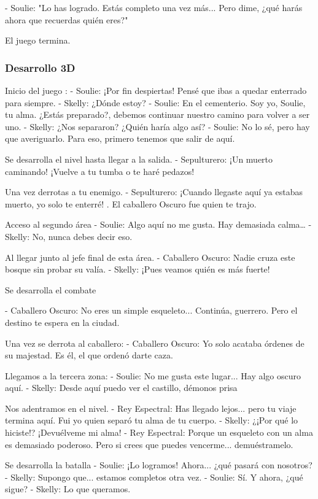 \documentclass[12pt,a4paper,twoside,spanish]{article}      %
\begin{document}
- Soulie: "Lo has logrado. Estás completo una vez más... Pero dime, ¿qué harás ahora que recuerdas quién eres?"

El juego termina.


\subsubsection{Desarrollo 3D}
Inicio del juego : 
- Soulie:  ¡Por fin despiertas! Pensé que ibas a quedar enterrado para siempre.
- Skelly:  ¿Dónde estoy?
- Soulie: En el cementerio. Soy yo,  Soulie, tu alma. ¿Estás preparado?, debemos continuar nuestro camino para volver a ser uno.
- Skelly:  ¿Nos separaron? ¿Quién haría algo así?
- Soulie: No lo sé, pero hay que averiguarlo. Para eso, primero tenemos que salir de aquí.


Se desarrolla el nivel hasta llegar a la salida. 
- Sepulturero:  ¡Un muerto caminando! ¡Vuelve a tu tumba o te haré pedazos!

Una vez derrotas a tu enemigo.
- Sepulturero: ¡Cuando llegaste aquí ya estabas muerto, yo solo te enterré! . El caballero Oscuro fue quien te trajo.

Acceso al segundo área 
- Soulie: Algo aquí no me gusta. Hay demasiada calma…
- Skelly: No, nunca debes decir eso.

Al llegar junto al jefe final de esta área.
- Caballero Oscuro: Nadie cruza este bosque sin probar su valía.
- Skelly: ¡Pues veamos quién es más fuerte!

Se desarrolla el combate 

- Caballero Oscuro:  No eres un simple esqueleto... Continúa, guerrero. Pero el destino te espera en la ciudad.

Una vez se derrota al caballero:
- Caballero Oscuro:  Yo solo acataba órdenes de su majestad. Es él, el que ordenó darte caza.

Llegamos a la tercera zona:
- Soulie: No me gusta este lugar... Hay algo oscuro aquí.
- Skelly: Desde aquí puedo ver el castillo, démonos prisa

Nos adentramos en el nivel.
- Rey Espectral: Has llegado lejos... pero tu viaje termina aquí. Fui yo quien separó tu alma de tu cuerpo.
- Skelly: ¿¡Por qué lo hiciste!? ¡Devuélveme mi alma!
- Rey Espectral: Porque un esqueleto con un alma es demasiado poderoso. Pero si crees que puedes vencerme... demuéstramelo.

Se desarrolla la batalla
- Soulie:  ¡Lo logramos! Ahora... ¿qué pasará con nosotros?
- Skelly:  Supongo que... estamos completos otra vez.
- Soulie: Sí. Y ahora, ¿qué sigue?
- Skelly:  Lo que queramos.
\end{document}
